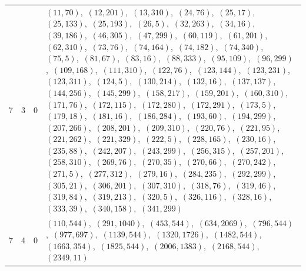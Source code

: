\documentclass[11pt]{article}
\begin{document}
\begin{longtable}{@{}rrl>{\raggedright\arraybackslash}p{}@{}}
7 & 3 & $0$ & $(11,70)$,\allowbreak\ $(12,201)$,\allowbreak\ $(13,310)$,\allowbreak\ $(24,76)$,\allowbreak\ $(25,17)$,\allowbreak\ $(25,133)$,\allowbreak\ $(25,193)$,\allowbreak\ $(26,5)$,\allowbreak\ $(32,263)$,\allowbreak\ $(34,16)$,\allowbreak\ $(39,186)$,\allowbreak\ $(46,305)$,\allowbreak\ $(47,299)$,\allowbreak\ $(60,119)$,\allowbreak\ $(61,201)$,\allowbreak\ $(62,310)$,\allowbreak\ $(73,76)$,\allowbreak\ $(74,164)$,\allowbreak\ $(74,182)$,\allowbreak\ $(74,340)$,\allowbreak\ $(75,5)$,\allowbreak\ $(81,67)$,\allowbreak\ $(83,16)$,\allowbreak\ $(88,333)$,\allowbreak\ $(95,109)$,\allowbreak\ $(96,299)$,\allowbreak\ $(109,168)$,\allowbreak\ $(111,310)$,\allowbreak\ $(122,76)$,\allowbreak\ $(123,144)$,\allowbreak\ $(123,231)$,\allowbreak\ $(123,311)$,\allowbreak\ $(124,5)$,\allowbreak\ $(130,214)$,\allowbreak\ $(132,16)$,\allowbreak\ $(137,137)$,\allowbreak\ $(144,256)$,\allowbreak\ $(145,299)$,\allowbreak\ $(158,217)$,\allowbreak\ $(159,201)$,\allowbreak\ $(160,310)$,\allowbreak\ $(171,76)$,\allowbreak\ $(172,115)$,\allowbreak\ $(172,280)$,\allowbreak\ $(172,291)$,\allowbreak\ $(173,5)$,\allowbreak\ $(179,18)$,\allowbreak\ $(181,16)$,\allowbreak\ $(186,284)$,\allowbreak\ $(193,60)$,\allowbreak\ $(194,299)$,\allowbreak\ $(207,266)$,\allowbreak\ $(208,201)$,\allowbreak\ $(209,310)$,\allowbreak\ $(220,76)$,\allowbreak\ $(221,95)$,\allowbreak\ $(221,262)$,\allowbreak\ $(221,329)$,\allowbreak\ $(222,5)$,\allowbreak\ $(228,165)$,\allowbreak\ $(230,16)$,\allowbreak\ $(235,88)$,\allowbreak\ $(242,207)$,\allowbreak\ $(243,299)$,\allowbreak\ $(256,315)$,\allowbreak\ $(257,201)$,\allowbreak\ $(258,310)$,\allowbreak\ $(269,76)$,\allowbreak\ $(270,35)$,\allowbreak\ $(270,66)$,\allowbreak\ $(270,242)$,\allowbreak\ $(271,5)$,\allowbreak\ $(277,312)$,\allowbreak\ $(279,16)$,\allowbreak\ $(284,235)$,\allowbreak\ $(292,299)$,\allowbreak\ $(305,21)$,\allowbreak\ $(306,201)$,\allowbreak\ $(307,310)$,\allowbreak\ $(318,76)$,\allowbreak\ $(319,46)$,\allowbreak\ $(319,84)$,\allowbreak\ $(319,213)$,\allowbreak\ $(320,5)$,\allowbreak\ $(326,116)$,\allowbreak\ $(328,16)$,\allowbreak\ $(333,39)$,\allowbreak\ $(340,158)$,\allowbreak\ $(341,299)$\\
7 & 4 & $0$ & $(110,544)$,\allowbreak\ $(291,1040)$,\allowbreak\ $(453,544)$,\allowbreak\ $(634,2069)$,\allowbreak\ $(796,544)$,\allowbreak\ $(977,697)$,\allowbreak\ $(1139,544)$,\allowbreak\ $(1320,1726)$,\allowbreak\ $(1482,544)$,\allowbreak\ $(1663,354)$,\allowbreak\ $(1825,544)$,\allowbreak\ $(2006,1383)$,\allowbreak\ $(2168,544)$,\allowbreak\ $(2349,11)$\\

\end{longtable}
\end{document}
